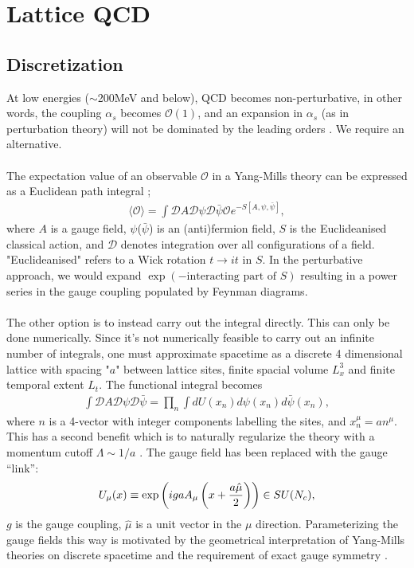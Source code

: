 \documentclass[a4paper,10pt]{article}
\numberwithin{equation}{section}
\begin{document}

\section{Lattice QCD}
\label{sec:lat}

\subsection{Discretization}

At low energies ($\sim$200MeV and below), QCD becomes non-perturbative, in other words, the coupling $\alpha_s$ becomes $\mathcal{O}(1)$, and an expansion in $\alpha_s$ (as in perturbation theory) will not be dominated by the leading orders \cite{Schwartz:2013pla}. We require an alternative.
\\ \\
The expectation value of an observable $\mathcal{O}$ in a Yang-Mills theory can be expressed as a Euclidean path integral \cite{Lepage:1998dt};
\begin{align}
 \langle \mathcal{O} \rangle = \int \mathcal{D}A\mathcal{D}\psi\mathcal{D}\bar{\psi} \mathcal{O} e^{-S[A,\psi,\bar{\psi}]},
\end{align}
where $A$ is a gauge field, $\psi$($\bar{\psi}$) is an (anti)fermion field, $S$ is the Euclideanised classical action, and $\mathcal{D}$ denotes integration over all configurations of a field. "Euclideanised" refers to a Wick rotation $t\to it$ in $S$. In the perturbative approach, we would expand $\exp(-\text{interacting part of }S )$ resulting in a power series in
the gauge coupling populated by Feynman diagrams.
\\ \\
The other option is to instead carry out the integral directly. This can only be done numerically.
 Since it's not numerically feasible to carry out an infinite number of integrals, one must approximate spacetime as a discrete 4 dimensional lattice with spacing "$a$" between lattice sites, finite spacial volume $L_x^3$ and finite temporal extent $L_t$. The functional integral becomes
\begin{align}
 \int \mathcal{D}A\mathcal{D}\psi\mathcal{D}\bar{\psi} = \prod_{n} \int dU(x_n) d\psi(x_n) d\bar{\psi}(x_n),
\end{align}
where $n$ is a 4-vector with integer components labelling the sites, and $x_n^{\mu} = an^{\mu}$.
This has a second benefit which is to naturally regularize the theory with a momentum cutoff $\Lambda \sim 1/a$ \cite{Lepage:1998dt}. The gauge field has been replaced with the gauge
``link'':
\begin{align}
U_{\mu}(x) \equiv \exp\left(igaA_{\mu}\left(x+{a\hat{\mu}\over2}\right)\right) \in SU(N_c),
\end{align}
$g$ is the gauge coupling, $\hat{\mu}$ is a unit vector in the $\mu$ direction. Parameterizing the gauge fields this way is motivated by the geometrical interpretation of Yang-Mills theories on discrete spacetime and the requirement of exact gauge symmetry \cite{Munster:2000ez}.
\end{document}
